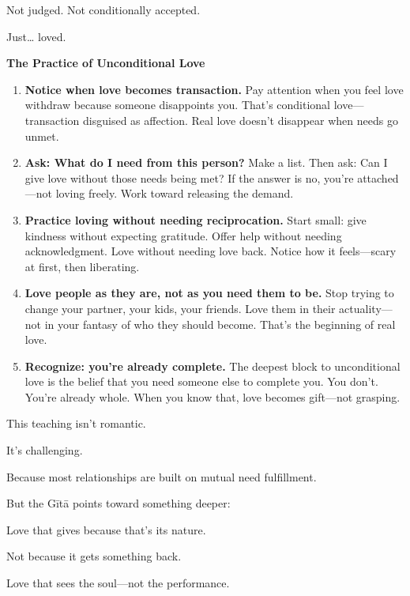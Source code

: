 \documentclass[11pt,twoside]{book}
\begin{document}
Not judged. Not conditionally accepted.

Just\ldots{} loved.

\begin{practicebox}
\textbf{The Practice of Unconditional Love}

\begin{enumerate}
\item \textbf{Notice when love becomes transaction.} Pay attention when you feel love withdraw because someone disappoints you. That's conditional love—transaction disguised as affection. Real love doesn't disappear when needs go unmet.

\item \textbf{Ask: What do I need from this person?} Make a list. Then ask: Can I give love without those needs being met? If the answer is no, you're attached—not loving freely. Work toward releasing the demand.

\item \textbf{Practice loving without needing reciprocation.} Start small: give kindness without expecting gratitude. Offer help without needing acknowledgment. Love without needing love back. Notice how it feels—scary at first, then liberating.

\item \textbf{Love people as they are, not as you need them to be.} Stop trying to change your partner, your kids, your friends. Love them in their actuality—not in your fantasy of who they should become. That's the beginning of real love.

\item \textbf{Recognize: you're already complete.} The deepest block to unconditional love is the belief that you need someone else to complete you. You don't. You're already whole. When you know that, love becomes gift—not grasping.
\end{enumerate}
\end{practicebox}

This teaching isn't romantic.

It's challenging.

Because most relationships are built on mutual need fulfillment.

But the Gītā points toward something deeper:

Love that gives because that's its nature.

Not because it gets something back.

Love that sees the soul—not the performance.
\end{document}
